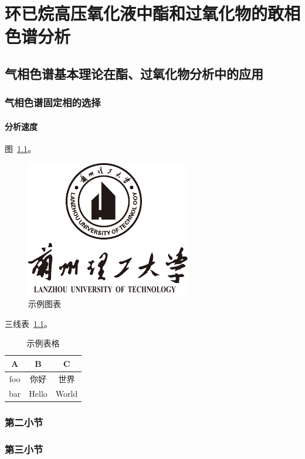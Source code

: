 \chapter{环已烷高压氧化液中酯和过氧化物的敢相色谱分析}

\section{气相色谱基本理论在酯、过氧化物分析中的应用}

\subsection{气相色谱固定相的选择}

\subsubsection{分析速度}

图~\ref{fig:demo}。

\begin{figure}[H]
    \centering
    \includegraphics[width=0.3\linewidth]{figures/lut-logo.pdf}
    \caption{示例图表}
    \label{fig:demo}
\end{figure}

三线表~\ref{table:demo}。

\begin{table}[H]
    \centering
    \caption{示例表格}
    \label{table:demo}
    \begin{tabular}{ccc}
        \toprule
        A   & B     & C     \\
        \midrule
        foo & 你好  & 世界  \\
        bar & Hello & World \\
        \bottomrule
    \end{tabular}
\end{table}


\subsection{第二小节}

\subsection{第三小节}

